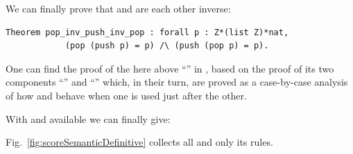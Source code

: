 We can finally prove that  and  are each other inverse:
{%
\normalfont
\begin{lstlisting}[language=Coq, label=lemma:popPushInverse]
        Theorem pop_inv_push_inv_pop : forall p : Z*(list Z)*nat,
            (pop (push p) = p) /\ (push (pop p) = p).
\end{lstlisting}
}%
\noindent
One can find the proof of the here above ``'' in \cite{PlazzoRoversi24RevPushPopGit}, based on the proof of its two components ``'' and ``'' which, in their turn, are proved as a case-by-case analysis of how  and  behave when one is used just after the other.


\vspace{\baselineskip}\noindent
With  and  available we can finally give:
\begin{definition}
\label{definition:rsemantics of SCORE}
Fig.~\ref{fig:scoreSemanticDefinitive} collects all and only its rules.
\end{definition}

